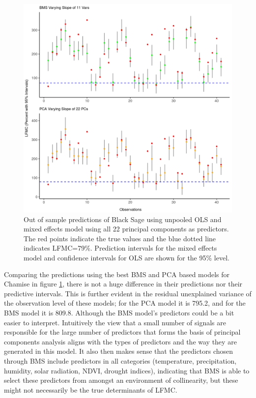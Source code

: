 \documentclass[twocolumn,10pt]{article}
\begin{document}
\begin{figure}
    \centering
    \includegraphics[scale=0.85, height=0.4\textheight]{figures/mixed_effects/sageblack_bms_pca_comparison_sageblack.png}
    \caption{Out of sample predictions of Black Sage using unpooled OLS and mixed effects model using all 22 principal components as predictors. The red points indicate the true values and the blue dotted line indicates LFMC=79\%. Prediction intervals for the mixed effects model and confidence intervals for OLS are shown for the 95\% level.  }
    \label{fig:bms_vs_pca}
\end{figure}

Comparing the predictions using the best BMS and PCA based models for Chamise in figure \ref{fig:bms_vs_pca}, there is not a huge difference in their predictions nor their predictive intervals. This is further evident in the residual unexplained variance of the observation level of these models; for the PCA model it is 795.2, and for the BMS model it is 809.8. Although the BMS model's predictors could be a bit easier to interpret.  Intuitively the view that a small number of signals are responsible for the large number of predictors that forms the basis of principal components analysis aligns with the types of predictors and the way they are generated in this model. It also then makes sense that the predictors chosen through BMS include predictors in all categories (temperature, precipitation, humidity, solar radiation, NDVI, drought indices), indicating that BMS is able to select these predictors from amongst an environment of collinearity, but these might not necessarily be the true determinants of LFMC. \\
\end{document}
